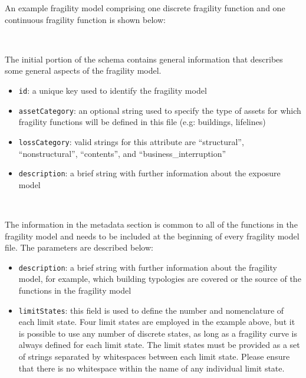 An example \gls{fragility model} comprising one discrete \gls{fragility
function} and one continuous \gls{fragility function} is shown below:

\inputminted[firstline=1,firstnumber=1,fontsize=\footnotesize,frame=single,linenos,bgcolor=lightgray]{xml}{oqum/risk/Verbatim/input_fragility.xml}\\


The initial portion of the schema contains general information that describes 
some general aspects of the fragility model.

\begin{itemize}

    \item \Verb+id+: a unique key used to identify the \gls{fragility model}

    \item \Verb+assetCategory+: an optional string used to specify the type of
    \glspl{asset} for which \glspl{fragility function} will be defined in this
    file (e.g: buildings, lifelines)

    \item \Verb+lossCategory+: valid strings for this attribute are 
    ``structural'', ``nonstructural'', ``contents'', and 
    ``business\_interruption''

    \item \Verb+description+: a brief string with further information about the
    \gls{exposure model}

\end{itemize}

\inputminted[firstline=4,firstnumber=4,lastline=9,fontsize=\footnotesize,frame=single,linenos,bgcolor=lightgray]{xml}{oqum/risk/Verbatim/input_fragility.xml}\\

The information in the metadata section is common to all of the functions in
the \gls{fragility model} and needs to be included at the beginning of every
\gls{fragility model} file. The parameters are described below:

\begin{itemize}

    \item \Verb+description+: a brief string with further information about the
    \gls{fragility model}, for example, which building typologies are covered or 
    the source of the functions in the \gls{fragility model}

    \item \Verb+limitStates+: this field is used to define the number and 
    nomenclature of each limit state. Four limit states are employed in the 
    example above, but it is possible to use any number of discrete states,
    as long as a fragility curve is always defined for each limit state. The 
    limit states must be provided as a set of strings separated by whitespaces 
    between each limit state. Please ensure that there is no whitespace within 
    the name of any individual limit state.

\end{itemize}

